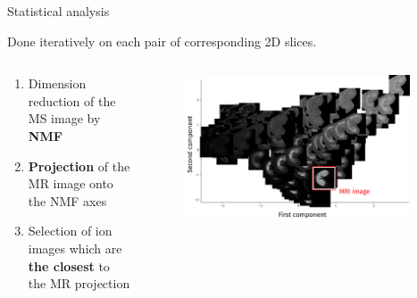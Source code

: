 \documentclass[10pt]{beamer}
\begin{document}
\begin{frame}{Statistical analysis}

  Done iteratively on each pair of corresponding 2D slices.
  
  \begin{columns}
    \begin{column}[t]{0.6\textwidth}
      \begin{enumerate}
      \item Dimension reduction of the MS image by \textbf{NMF} 
      \item \textbf{Projection} of the MR image onto the NMF axes
      \item Selection of ion images which are \textbf{the closest} to the MR projection
      \end{enumerate}
    \end{column}
    \begin{column}[t]{0.4\textwidth}
      \begin{figure}[ht]
        \centering
        \includegraphics[width=0.95\textwidth]{fig/pca_big3_en}
      \end{figure}
    \end{column}
  \end{columns}
\end{frame}
\end{document}
